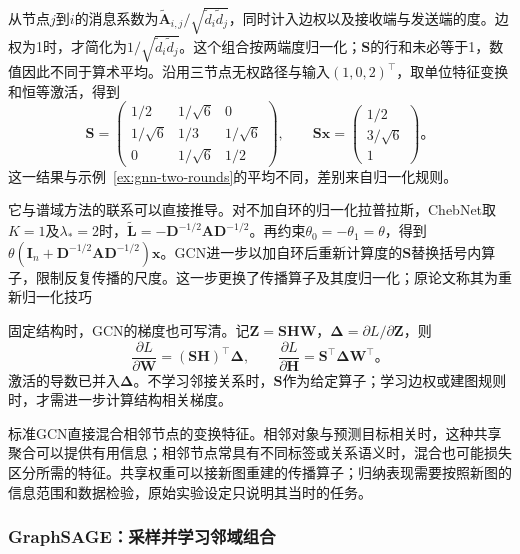 从节点$j$到$i$的消息系数为$\widetilde{\bm{A}}_{i,j}/\sqrt{\widetilde d_i\widetilde d_j}$，同时计入边权以及接收端与发送端的度。边权为1时，才简化为$1/\sqrt{\widetilde d_i\widetilde d_j}$。这个组合按两端度归一化；$\bm{S}$的行和未必等于1，数值因此不同于算术平均。沿用三节点无权路径与输入$(1,0,2)^{\top}$，取单位特征变换和恒等激活，得到
\begin{equation}
  \bm{S}=\begin{pmatrix}
    1/2&1/\sqrt6&0\\
    1/\sqrt6&1/3&1/\sqrt6\\
    0&1/\sqrt6&1/2
  \end{pmatrix},\qquad
  \bm{S}\bm{x}=\begin{pmatrix}1/2\\3/\sqrt6\\1\end{pmatrix}\text{。}
  \label{eq:gnn-gcn-example}
\end{equation}
这一结果与示例~\ref{ex:gnn-two-rounds}的平均不同，差别来自归一化规则。

它与谱域方法的联系可以直接推导。对不加自环的归一化拉普拉斯，ChebNet取$K=1$及$\lambda_*=2$时，$\widetilde{\bm{L}}=-\bm{D}^{-1/2}\bm{A}\bm{D}^{-1/2}$。再约束$\theta_0=-\theta_1=\theta$，得到$\theta(\bm{I}_n+\bm{D}^{-1/2}\bm{A}\bm{D}^{-1/2})\bm{x}$。GCN进一步以加自环后重新计算度的$\bm{S}$替换括号内算子，限制反复传播的尺度。这一步更换了传播算子及其度归一化；原论文称其为重新归一化技巧

固定结构时，GCN的梯度也可写清。记$\bm{Z}=\bm{S}\bm{H}\bm{W}$，$\bm{\Delta}=\partial L/\partial\bm{Z}$，则
\begin{equation}
  \frac{\partial L}{\partial\bm{W}}=(\bm{S}\bm{H})^{\top}\bm{\Delta},\qquad
  \frac{\partial L}{\partial\bm{H}}=\bm{S}^{\top}\bm{\Delta}\bm{W}^{\top}\text{。}
  \label{eq:gnn-gcn-backprop}
\end{equation}
激活的导数已并入$\bm{\Delta}$。不学习邻接关系时，$\bm{S}$作为给定算子；学习边权或建图规则时，才需进一步计算结构相关梯度。

标准GCN直接混合相邻节点的变换特征。相邻对象与预测目标相关时，这种共享聚合可以提供有用信息；相邻节点常具有不同标签或关系语义时，混合也可能损失区分所需的特征。共享权重可以接新图重建的传播算子；归纳表现需要按照新图的信息范围和数据检验，原始实验设定只说明其当时的任务。

\subsubsection{GraphSAGE：采样并学习邻域组合}
\label{sec:gnn-graphsage}

